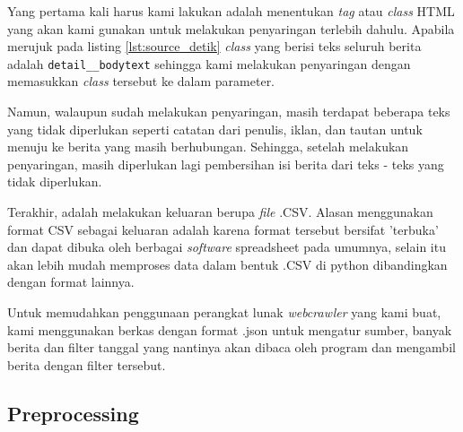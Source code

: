 Yang pertama kali harus kami lakukan adalah menentukan \textit{tag} atau \textit{class} HTML yang akan kami gunakan untuk melakukan penyaringan terlebih dahulu. Apabila merujuk pada listing \ref{lst:source_detik} \textit{class} yang berisi teks seluruh berita adalah \texttt{detail\_\_body\-text} sehingga kami melakukan penyaringan dengan memasukkan \textit{class} tersebut ke dalam parameter.

Namun, walaupun sudah melakukan penyaringan, masih terdapat beberapa teks yang tidak diperlukan seperti catatan dari penulis, iklan, dan tautan untuk menuju ke berita yang masih berhubungan. Sehingga, setelah melakukan penyaringan, masih diperlukan lagi pembersihan isi berita dari teks - teks yang tidak diperlukan.

Terakhir, adalah melakukan keluaran berupa \textit{file} .CSV. Alasan menggunakan format CSV sebagai keluaran adalah karena format tersebut bersifat 'terbuka' dan dapat dibuka oleh berbagai \textit{software} spreadsheet pada umumnya, selain itu akan lebih mudah memproses data dalam bentuk .CSV di python dibandingkan dengan format lainnya.

Untuk memudahkan penggunaan perangkat lunak \textit{webcrawler} yang kami buat, kami menggunakan berkas dengan format .json untuk mengatur sumber, banyak berita dan filter tanggal yang nantinya akan dibaca oleh program dan mengambil berita dengan filter tersebut.

\subsection{Preprocessing}

